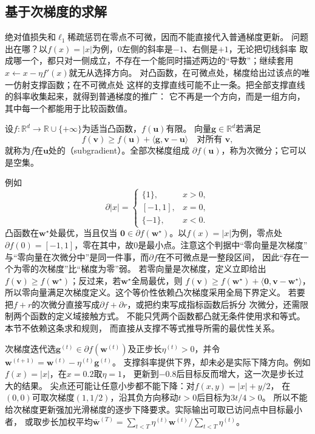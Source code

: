 \subsection{基于次梯度的求解}
\label{sec:opt-subgradient-methods}

绝对值损失和$\ell_1$稀疏惩罚在零点不可微，因而不能直接代入普通梯度更新。
问题出在哪？以$f(x)=|x|$为例，$0$左侧的斜率是$-1$、右侧是$+1$，无论把切线斜率
取成哪一个，都只对一侧成立，不存在一个能同时描述两边的“导数”；继续套用
$x\leftarrow x-\eta f'(x)$就无从选择方向。
对凸函数，在可微点处，梯度给出过该点的唯一仿射支撑函数；在不可微点处
这样的支撑直线可能不止一条。把全部支撑直线的斜率收集起来，就得到普通梯度的推广：
它不再是一个方向，而是一组方向，其中每一个都能用于比较函数值。
\begin{definition}[凸次梯度与次微分]
\label{def:opt-convex-subgradient}
设$f:\mathbb R^d\to\mathbb R\cup\{+\infty\}$为适当凸函数，$f(\bm u)$有限。
向量$\bm{g}\in\mathbb R^d$若满足
\[
  f(\bm{v})\geq f(\bm{u})+\langle\bm{g},\bm{v}-\bm{u}\rangle
  \quad\text{对所有 }\bm{v},
\]
就称为$f$在$\bm{u}$处的（subgradient）。全部次梯度组成
$\partial f(\bm{u})$，称为次微分；它可以是空集。
\end{definition}
例如
\[
  \partial |x|=
  \begin{cases}
    \{1\},&x>0,\\
    [-1,1],&x=0,\\
    \{-1\},&x<0.
  \end{cases}
\]
凸函数在$\bm{w}^{\star}$处最优，当且仅当
$\bm{0}\in\partial f(\bm{w}^{\star})$。以$f(x)=|x|$为例，零点处
$\partial f(0)=[-1,1]$，零在其中，故$0$是最小点。注意这个判据中“零向量是次梯度”
与“零向量在次微分中”是同一件事，而$\partial f$在不可微点是一整段区间，
因此“存在一个为零的次梯度”比“梯度为零”弱。
若零向量是次梯度，定义立即给出
$f(\bm{v})\geq f(\bm{w}^{\star})$；反过来，若$\bm{w}^{\star}$全局最优，则
$f(\bm{v})\geq f(\bm{w}^{\star})+\langle\bm{0},\bm{v}-\bm{w}^{\star}\rangle$，
所以零向量满足次梯度定义。这个等价性依赖凸次梯度采用全局下界定义。
若要把$f+r$的次微分直接写成$\partial f+\partial r$，或把约束写成指标函数后拆分
次微分，还需限制两个函数的定义域接触方式。
不能只凭两个函数都凸就无条件使用求和等式。本节不依赖这条求和规则，
而直接从支撑不等式推导所需的最优性关系。

次梯度迭代选$\bm g^{(t)}\in\partial f(\bm w^{(t)})$及正步长$\eta^{(t)}>0$，并令
$\bm w^{(t+1)}=\bm w^{(t)}-\eta^{(t)}\bm g^{(t)}$。
支撑斜率提供下界，却未必是实际下降方向。例如$f(x)=|x|$，在$x=0.2$取$\eta=1$，
更新到$-0.8$后目标反而增大，这一次是步长过大的结果。
尖点还可能让任意小步都不能下降：对$f(x,y)=|x|+y/2$，
在$(0,0)$可取次梯度$(1,1/2)$，沿其负方向移动$t>0$后目标为$3t/4>0$。
所以不能给次梯度更新强加光滑梯度的逐步下降要求。实际输出可取已访问点中目标最小者，
或取步长加权平均$\bar{\bm w}^{(T)}=\sum_{t<T}\eta^{(t)}\bm w^{(t)}/\sum_{t<T}\eta^{(t)}$。


